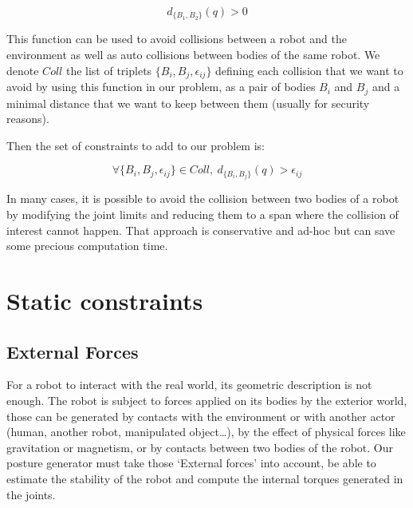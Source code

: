 \begin{equation}
  \boxed{d_{\{B_1, B_2\}}(q) > 0}
\end{equation}

This function can be used to avoid collisions between a robot and the environment as well as auto collisions between bodies of the same robot.
We denote $Coll$ the list of triplets $\{B_i, B_j, \epsilon_{ij}\}$ defining each collision that we want to avoid by using this function in our problem, as a pair of bodies $B_i$ and $B_j$ and a minimal distance that we want to keep between them (usually for security reasons).

Then the set of constraints to add to our problem is:

\begin{equation}
  \boxed{\forall \{B_i, B_j, \epsilon_{ij}\} \in Coll,\ d_{\{B_i, B_j\}}(q) > \epsilon_{ij}}
\end{equation}

In many cases, it is possible to avoid the collision between two bodies of a robot by modifying the joint limits and reducing them to a span where the collision of interest cannot happen. That approach is conservative and ad-hoc but can save some precious computation time.



\section{Static constraints}
\label{sec:static_constraints}


\subsection{External Forces}
\label{sub:external_forces}


For a robot to interact with the real world, its geometric description is not enough.
The robot is subject to forces applied on its bodies by the exterior world, those can be generated by contacts with the environment or with another actor (human, another robot, manipulated object\ldots), by the effect of physical forces like gravitation or magnetism, or by contacts between two bodies of the robot.
Our posture generator must take those `External forces' into account, be able to estimate the stability of the robot and compute the internal torques generated in the joints.

